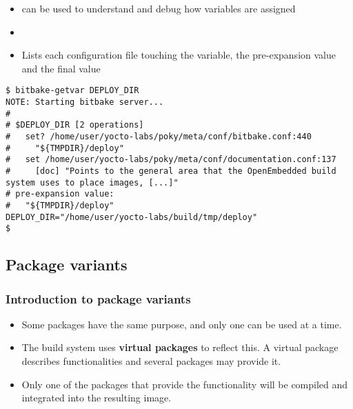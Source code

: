 \begin{frame}[fragile]
  \frametitle{}
  \begin{itemize}
    \item {} can be used to understand and debug
      how variables are assigned
    \item {}
    \item Lists each configuration file touching the variable, the
      pre-expansion value and the final value
  \end{itemize}
  \begin{block}{}
    \begin{verbatim}
$ bitbake-getvar DEPLOY_DIR
NOTE: Starting bitbake server...
#
# $DEPLOY_DIR [2 operations]
#   set? /home/user/yocto-labs/poky/meta/conf/bitbake.conf:440
#     "${TMPDIR}/deploy"
#   set /home/user/yocto-labs/poky/meta/conf/documentation.conf:137
#     [doc] "Points to the general area that the OpenEmbedded build system uses to place images, [...]"
# pre-expansion value:
#   "${TMPDIR}/deploy"
DEPLOY_DIR="/home/user/yocto-labs/build/tmp/deploy"
$
    \end{verbatim}
  \end{block}
\end{frame}

\subsection{Package variants}

\begin{frame}
  \frametitle{Introduction to package variants}
  \begin{itemize}
    \item Some packages have the same purpose, and only one can be
      used at a time.
    \item The build system uses {\bf virtual packages} to reflect
      this. A virtual package describes functionalities and several
      packages may provide it.
    \item Only one of the packages that provide the functionality will
    be compiled and integrated into the resulting image.
  \end{itemize}
\end{frame}

